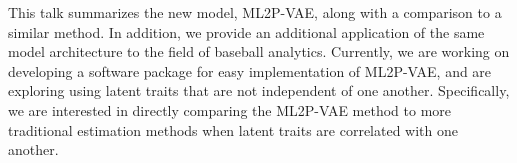 \documentclass[a4paper]{article}
\begin{document}
This talk summarizes the new model, ML2P-VAE, along with a comparison to a similar method. In addition, we provide an additional application of the same model architecture to the field of baseball analytics. Currently, we are working on developing a software package for easy implementation of ML2P-VAE, and are exploring using latent traits that are not independent of one another. Specifically, we are interested in directly comparing the ML2P-VAE method to more traditional estimation methods when latent traits are correlated with one another.




\end{document}
